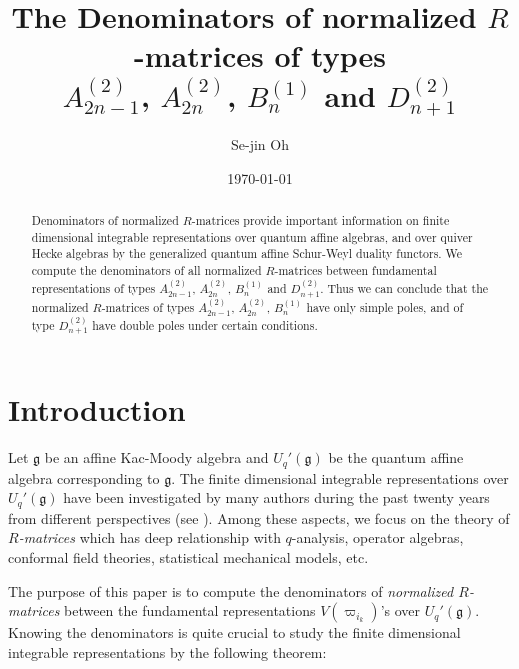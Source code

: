 \documentclass[11pt, leqno]{amsart}
\title[The Denominators of normalized $R$-matrices] {The Denominators of normalized $R$-matrices of
types \\ $A_{2n-1}^{(2)}$, $A_{2n}^{(2)}$, $B_{n}^{(1)}$ and
$D_{n+1}^{(2)}$}
\author[Se-jin Oh]{Se-jin Oh}
\date{\today}
\theoremstyle{definition}
\numberwithin{equation}{section}
\begin{document}
\begin{abstract} Denominators of normalized $R$-matrices provide important information on finite dimensional integrable representations
over quantum affine algebras, and over quiver Hecke algebras by the generalized quantum affine Schur-Weyl duality functors.
We compute the denominators of all normalized $R$-matrices between fundamental representations of types $A_{2n-1}^{(2)}$, $A_{2n}^{(2)}$, $B_{n}^{(1)}$ and
$D_{n+1}^{(2)}$. Thus we can conclude that the normalized $R$-matrices of types $A_{2n-1}^{(2)}$, $A_{2n}^{(2)}$, $B_{n}^{(1)}$ have only simple poles,
and of type $D_{n+1}^{(2)}$ have double poles under certain conditions.
\end{abstract}

\maketitle

\section*{Introduction}

Let ${\mathfrak g}$ be an affine Kac-Moody algebra and $U_q'({\mathfrak g})$ be the quantum affine algebra corresponding to ${\mathfrak g}$.
The finite dimensional integrable representations over $U_q'({\mathfrak g})$ have been investigated by many authors during the past twenty years from different
perspectives (see \cite{AK,CH,CP94,FR,GV,Kas02,Nak}). Among these aspects, we focus on the theory of {\it $R$-matrices} which has deep relationship with
$q$-analysis, operator algebras, conformal field theories, statistical mechanical models, etc.

The purpose of this paper is to compute the denominators of {\it normalized $R$-matrices} between the fundamental representations
$V(\varpi_{i_k})$'s over $U_q'({\mathfrak g})$. Knowing the denominators is quite crucial to study the finite dimensional integrable
representations by the following theorem:
\bigskip
\end{document}
